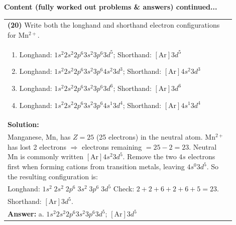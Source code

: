 \documentclass{article}
\begin{document}
\newpage
\noindent
{\large\textbf{Content (fully worked out problems \& answers) continued...}}\\[0.2em]
\vspace{0.2cm}
\begin{tabular}{|p{0.9\linewidth}|}
\hline
\vspace{0.2cm}
\textbf{(20)} Write both the longhand and shorthand electron configurations for Mn$^{2+}$. \\
\begin{minipage}[t]{0.85\linewidth}
\begin{enumerate}[label=\alph*.]
\item Longhand: $1s^{2}2s^{2}2p^{6}3s^{2}3p^{6}3d^{5}$; Shorthand: $[\text{Ar}]3d^{5}$
\item Longhand: $1s^{2}2s^{2}2p^{6}3s^{2}3p^{6}4s^{2}3d^{3}$; Shorthand: $[\text{Ar}]4s^{2}3d^{3}$
\item Longhand: $1s^{2}2s^{2}2p^{6}3s^{2}3p^{6}3d^{6}$; Shorthand: $[\text{Ar}]3d^{6}$
\item Longhand: $1s^{2}2s^{2}2p^{6}3s^{2}3p^{6}4s^{1}3d^{4}$; Shorthand: $[\text{Ar}]4s^{1}3d^{4}$
\end{enumerate}
\end{minipage}\\
\hline
\vspace{0.2cm}
\textbf{Solution:} \\
Manganese, Mn, has $Z=25$ (25 electrons) in the neutral atom. Mn$^{2+}$ has lost 2 electrons $\Rightarrow$ electrons remaining $=25-2=23$. Neutral Mn is commonly written $[\text{Ar}]4s^{2}3d^{5}$. Remove the two $4s$ electrons first when forming cations from transition metals, leaving $4s^{0}3d^{5}$. So the resulting configuration is: \\
Longhand: $1s^{2}\;2s^{2}\;2p^{6}\;3s^{2}\;3p^{6}\;3d^{5}$
Check: $2+2+6+2+6+5=23$. \\
Shorthand: $[\text{Ar}]3d^{5}$. \\
\hline
\vspace{0.2cm}
\textbf{Answer:} a. $1s^{2}2s^{2}2p^{6}3s^{2}3p^{6}3d^{5}$; $[\text{Ar}]3d^{5}$\\
\hline
\end{tabular}
 
\end{document}
